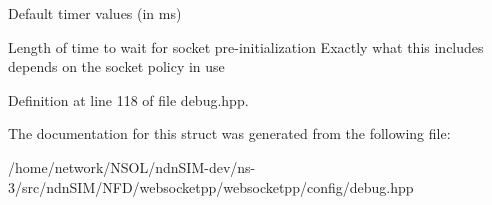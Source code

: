Default timer values (in ms) 

Length of time to wait for socket pre-\/initialization Exactly what this includes depends on the socket policy in use 

Definition at line 118 of file debug.\+hpp.



The documentation for this struct was generated from the following file\+:\begin{DoxyCompactItemize}
\item 
/home/network/\+N\+S\+O\+L/ndn\+S\+I\+M-\/dev/ns-\/3/src/ndn\+S\+I\+M/\+N\+F\+D/websocketpp/websocketpp/config/debug.\+hpp\end{DoxyCompactItemize}
